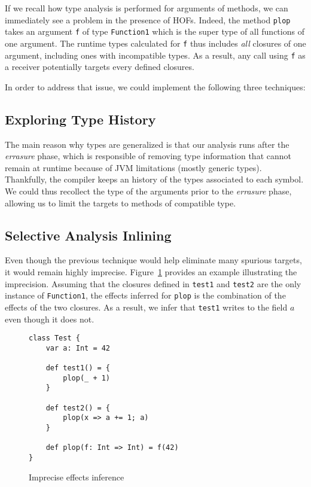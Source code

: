 If we recall how type analysis is performed for arguments of methods, we can
immediately see a problem in the presence of HOFs. Indeed, the method
\lstinline{plop} takes an argument \lstinline{f} of type \lstinline{Function1}
which is the super type of all functions of one argument. The runtime types
calculated for \lstinline{f} thus includes \emph{all} closures of one argument,
including ones with incompatible types. As a result, any call using
\lstinline{f} as a receiver potentially targets every defined closures.

In order to address that issue, we could implement the following three
techniques:

\subsection{Exploring Type History}
The main reason why types are generalized is that our analysis runs
after the \emph{errasure} phase, which is responsible of removing type
information that cannot remain at runtime because of JVM limitations (mostly
generic types). Thankfully, the compiler keeps an history of the types
associated to each symbol. We could thus recollect the type of the arguments
prior to the \emph{errasure} phase, allowing us to limit the targets to methods
of compatible type.

\subsection{Selective Analysis Inlining}
Even though the previous technique would help eliminate many spurious targets,
it would remain highly imprecise. Figure~\ref{fig:con:inl} provides an example
illustrating the imprecision. Assuming that the closures defined in
\lstinline{test1} and \lstinline{test2} are the only instance of
\lstinline{Function1}, the effects inferred for \lstinline{plop} is the
combination of the effects of the two closures. As a result, we infer that
\lstinline{test1} writes to the field $a$ even though it does not.

\begin{figure}[h]
    \centering
\begin{lstlisting}
class Test {
    var a: Int = 42

    def test1() = {
        plop(_ + 1)
    }

    def test2() = {
        plop(x => a += 1; a)
    }

    def plop(f: Int => Int) = f(42)
}
\end{lstlisting}
    \caption{Imprecise effects inference}
    \label{fig:con:inl}
\end{figure}

